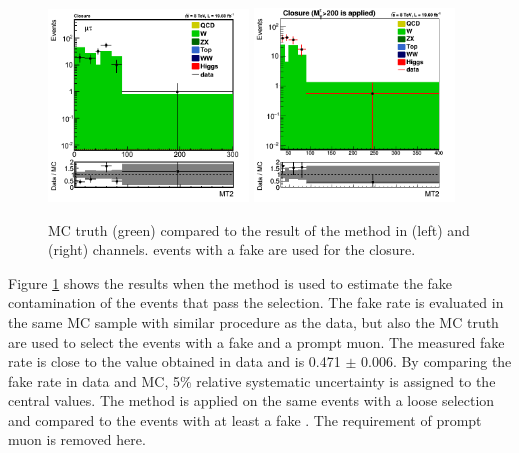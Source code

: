 \begin{figure}[!Hhtb]
\centering
\includegraphics[width=0.475\textwidth,keepaspectratio=true]{FakeRateMuTau/Estimation_pfWJets_ExtraLepExcl_SameSignWeightedHiggs_tauMTApplied.png}
\includegraphics[width=0.475\textwidth,keepaspectratio=true]{FakeRateEleTau/closure_eletau_taumt200.png}
\caption{MC truth (green) compared to the result of the method in \muTau (left) and \eTau (right) channels. \wjets events with a fake \Tau are used for the closure.}
\label{fig:LepTauClusure}
\end{figure}
Figure \ref{fig:LepTauClusure} shows the results when the method is used to estimate the fake contamination of the \wjets events 
that pass the selection. 
The fake rate is evaluated in the same MC sample with similar procedure as the data, but  
also the MC truth are used to select the events with a fake \Tau and a prompt muon. 
The measured fake rate is close to the value obtained in data and is 0.471 $\pm$  0.006. By comparing the fake rate in data and MC, 5\% relative systematic uncertainty is
assigned to the central values.
The method is applied on the same events with a loose \Tau selection and compared to the \wjets events with at least 
a fake \Tau. The requirement of prompt muon is removed here.
